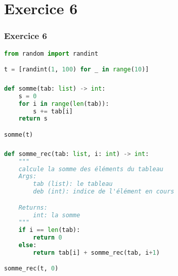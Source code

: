 \documentclass[svgnames,11pt]{beamer}
\begin{document}
\section{Exercice 6}
\begin{frame}[fragile]
    \frametitle{Exercice 6}

\begin{center}
\begin{lstlisting}[language=Python , basicstyle=\ttfamily\small, xleftmargin=2em, xrightmargin=2em]
from random import randint

t = [randint(1, 100) for _ in range(10)]
\end{lstlisting}
\end{center}

\end{frame}
\begin{frame}[fragile]
    \frametitle{}

\begin{center}
\begin{lstlisting}[language=Python , basicstyle=\ttfamily\small, xleftmargin=2em, xrightmargin=2em]
def somme(tab: list) -> int:
    s = 0
    for i in range(len(tab)):
        s += tab[i]
    return s

somme(t)
\end{lstlisting}
\end{center}

\end{frame}
\begin{frame}[fragile]
    \frametitle{}

\begin{center}
\begin{lstlisting}[language=Python , basicstyle=\ttfamily\small, xleftmargin=1em, xrightmargin=0.5em]
def somme_rec(tab: list, i: int) -> int:
    """
    calcule la somme des éléments du tableau
    Args:
        tab (list): le tableau
        deb (int): indice de l'élément en cours

    Returns:
        int: la somme
    """    
    if i == len(tab):
        return 0
    else:
        return tab[i] + somme_rec(tab, i+1)

somme_rec(t, 0)
\end{lstlisting}
\label{CODE}
\end{center}

\end{frame}
\end{document}
